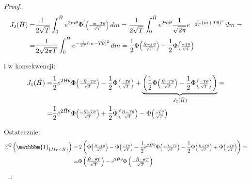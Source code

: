 \documentclass[11pt]{report}
\newcommand*{\Scale}[2][4]{\scalebox{#1}{$#2$}}%
\begin{document}
\begin{proof}

\begin{multline*}
\begin{split}
J_2(\tilde{H}) = & \frac{1}{2\sqrt{T}}\int_{0}^{\tilde{H}}e^{2m\theta}\Phi^{'} \Scale[0.8]{\left(\frac{-m-T\theta}{\sqrt{T}}\right)}\,dm = \frac{1}{2\sqrt{T}} \int_{0}^{\tilde{H}} e^{2m\theta} \frac{1}{\sqrt{2\pi}}e^{-\frac{1}{2T}(m + T\theta )^2} \,dm = \\ = & \frac{1}{2\sqrt{2 \pi T}} \int_{0}^{\tilde{H}} e^{-\frac{1}{2T}(m - T\theta )^2} \,dm = \frac{1}{2} \Phi \Scale[0.8]{\left(\frac{\tilde{H}-T\theta}{\sqrt{T}}\right)} - \frac{1}{2} \Phi \Scale[0.8]{\left(\frac{-T\theta}{\sqrt{T}}\right)}
\end{split}
\end{multline*}



i w konsekwencji:
\begin{equation*}
\begin{split}
J_1(\tilde{H}) = & \frac{1}{2}e^{2\tilde{H}\theta}\Phi \Scale[0.8]{\left(\frac{-\tilde{H}-T\theta}{\sqrt{T}}\right)} - \frac{1}{2}\Phi \Scale[0.8]{\left(\frac{-T\theta}{\sqrt{T}}\right)} + \underbrace{\left(\frac{1}{2} \Phi \Scale[0.8]{\left(\frac{\tilde{H}-T\theta}{\sqrt{T}}\right)} - \frac{1}{2} \Phi \Scale[0.8]{\left(\frac{-T\theta}{\sqrt{T}}\right)}\right)}_{J_2(\tilde{H})} = \\ = &  \frac{1}{2}e^{2\tilde{H}\theta}\Phi \Scale[0.8]{\left(\frac{-\tilde{H}-T\theta}{\sqrt{T}}\right)} + \frac{1}{2} \Phi \Scale[0.8]{\left(\frac{\tilde{H}-T\theta}{\sqrt{T}}\right)} - \Phi \Scale[0.8]{\left(\frac{-T\theta}{\sqrt{T}}\right)}
\end{split}
\end{equation*}


Ostatecznie:
\begin{multline*}
\begin{split}
\mathbb{E}^{\mathbb{Q}}\left(\mathbbm{1}_{ \{ M_T<H \} } \right) = & \, 2\left(  \Phi \Scale[0.8]{\left(\frac{\tilde{H}-T\theta}{\sqrt{T}}\right)} - \Phi \Scale[0.8]{\left(\frac{-T\theta}{\sqrt{T}}\right)} - \frac{1}{2}e^{2\tilde{H}\theta}\Phi \Scale[0.8]{\left(\frac{-\tilde{H}-T\theta}{\sqrt{T}}\right)} - \frac{1}{2} \Phi \Scale[0.8]{\left(\frac{\tilde{H}+T\theta}{\sqrt{T}}\right)} + \Phi \Scale[0.8]{\left(\frac{-T\theta}{\sqrt{T}}\right)} \right) = \\ = &
\Scale[1.0]{\Phi\left(\frac{ \tilde{H}-\theta T }{\sqrt{T}} \right) - e^{2\tilde{H}\theta}\Phi\left(\frac{ -\tilde{H}-\theta T }{\sqrt{T}} \right) }
\end{split}
\end{multline*}


\end{proof}
\end{document}
